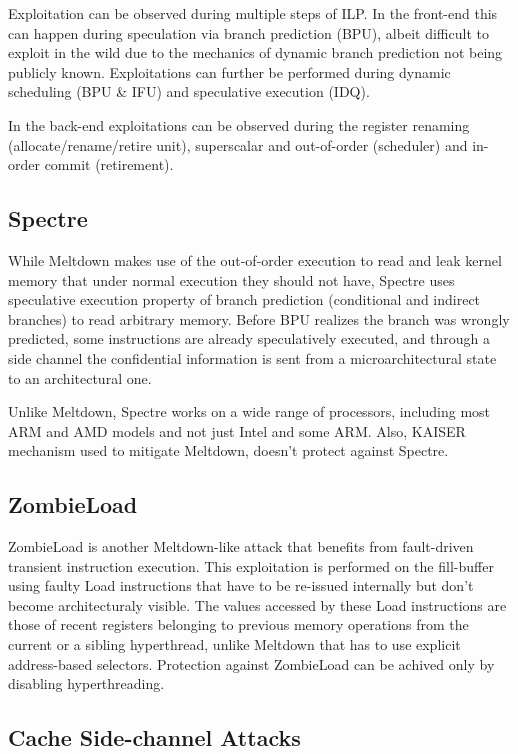 \documentclass[sigconf]{acmart}
\begin{document}
Exploitation can be observed during multiple steps of ILP. In the front-end this can happen during speculation via branch prediction (BPU), albeit difficult to exploit in the wild due to the mechanics of dynamic branch prediction not being publicly known. Exploitations can further be performed during dynamic scheduling (BPU \& IFU) and speculative execution (IDQ).

In the back-end exploitations can be observed during the register renaming (allocate/rename/retire unit), superscalar and out-of-order (scheduler) and in-order commit (retirement).

\subsection{Spectre}

While Meltdown makes use of the out-of-order execution to read and leak kernel memory that under normal execution they should not have, Spectre uses speculative execution property of branch prediction (conditional and indirect branches) to read arbitrary memory. Before BPU realizes the branch was wrongly predicted, some instructions are already speculatively executed, and through a side channel the confidential information is sent from a microarchitectural state to an architectural one. 

Unlike Meltdown, Spectre works on a wide range of processors, including most ARM and AMD models and not just Intel and some ARM. Also, KAISER mechanism used to mitigate Meltdown, doesn't protect against Spectre. 

\subsection{ZombieLoad}

ZombieLoad is another Meltdown-like attack that benefits from fault-driven transient instruction execution. This exploitation is performed on the fill-buffer using faulty Load instructions that have to be re-issued internally but don't become architecturaly visible. The values accessed by these Load instructions are those of recent registers belonging to previous memory operations from the current or a sibling hyperthread, unlike Meltdown that has to use explicit address-based selectors. Protection against ZombieLoad can be achived only by disabling hyperthreading. 

\subsection{Cache Side-channel Attacks}
\end{document}
